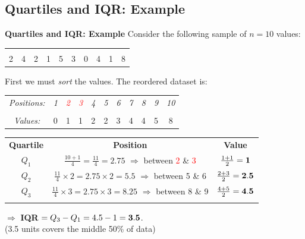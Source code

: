\documentclass[compress]{beamer}        %
\makeatletter
\newcommand{\tcb}{\textcolor{beamer@blendedblue}}
\newcommand{\tcr}{\textcolor{red}}
\newcommand{\tcRg}{\textcolor{Rgreen}}
\makeatother
\begin{document}
\subsection{Quartiles and IQR: Example}
\begin{frame}{\bf \tcb{Quartiles and IQR: Example}}
Consider the following sample of $n=10$ values:\\[-0.2cm]
\begin{center}
\begin{tabular}{|cccccccccc|}
\hline
&&&&&&&&&\\[-0.4cm]
2 & 4 & 2 & 1 & 5 & 3 & 0 & 4 & 1 & 8 \\
\hline
\end{tabular}
\end{center}
First we must \emph{sort} the values. The reordered dataset is:\\[-0.2cm]
\begin{center}
\begin{tabular}{|ccccccccccc|}
\multicolumn{1}{c}{\emph{Positions:}} & \multicolumn{1}{c}{\emph{1}} & \emph{\tcr{2}} & \emph{\tcr{3}} & \emph{4} & \emph{\tcb{5}} & \emph{\tcb{6}} & \emph{7} & \emph{\tcRg{8}} & \emph{\tcRg{9}} & \multicolumn{1}{c}{\emph{10}} \\
\cline{1-11}
&&&&&&&&&&\\[-0.4cm]
\multicolumn{1}{|c}{\emph{Values:}} & 0 & 1 & 1 & 2 & 2 & 3 & 4 & 4 & 5 & 8 \\
\cline{1-11}
\end{tabular}
\end{center}


\begin{tabular}{c|c|c}
{\bf Quartile} & {\bf Position} & {\bf Value} \\[0.1cm]
$Q_1$ & $\tfrac{10+1}{4} = \tfrac{11}{4} = 2.75$\,\,$\Rightarrow$ between \tcr{2} \& \tcr{3} & $\tfrac{1+1}{2} = {\bf1}$\\[0.3cm]
$Q_2$ & $\tfrac{11}{4}\times2 = 2.75\times2 = 5.5$\,\,$\Rightarrow$ between \tcb{5} \& \tcb{6} & $\tfrac{2+3}{2} = {\bf2.5}$\\[0.3cm]
$Q_3$ & $\tfrac{11}{4}\times3 = 2.75\times3 = 8.25$ $\Rightarrow$ between \tcRg{8} \& \tcRg{9} & $\tfrac{4+5}{2} = {\bf4.5}$\\
\multicolumn{3}{c}{}\\
\end{tabular}

$\Rightarrow$ {\bf IQR} $= Q_3 - Q_1 = 4.5 - 1 = {\bf3.5}$. \\
{\footnotesize (3.5 units covers the middle 50\% of data)}

\end{frame}
\end{document}
